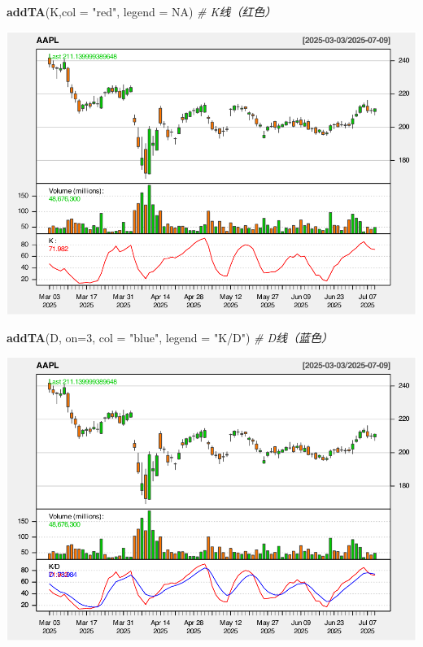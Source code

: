 \documentclass[]{ctexbook}
\newenvironment{Shaded}{\begin{snugshade}}{\end{snugshade}}
\newcommand{\AttributeTok}[1]{\textcolor[rgb]{0.13,0.29,0.53}{#1}}
\newcommand{\CommentTok}[1]{\textcolor[rgb]{0.56,0.35,0.01}{\textit{#1}}}
\newcommand{\ConstantTok}[1]{\textcolor[rgb]{0.56,0.35,0.01}{#1}}
\newcommand{\DecValTok}[1]{\textcolor[rgb]{0.00,0.00,0.81}{#1}}
\newcommand{\FunctionTok}[1]{\textcolor[rgb]{0.13,0.29,0.53}{\textbf{#1}}}
\newcommand{\NormalTok}[1]{#1}
\newcommand{\StringTok}[1]{\textcolor[rgb]{0.31,0.60,0.02}{#1}}
\begin{document}
\begin{Shaded}
\begin{Highlighting}[]
\FunctionTok{addTA}\NormalTok{(K,}\AttributeTok{col =} \StringTok{"red"}\NormalTok{, }\AttributeTok{legend =} \ConstantTok{NA}\NormalTok{)    }\CommentTok{\# K线（红色）}
\end{Highlighting}
\end{Shaded}

\includegraphics[width=0.9\linewidth]{quantmod_files/figure-latex/wpr_2-2}

\begin{Shaded}
\begin{Highlighting}[]
\FunctionTok{addTA}\NormalTok{(D, }\AttributeTok{on=}\DecValTok{3}\NormalTok{, }\AttributeTok{col =} \StringTok{"blue"}\NormalTok{, }\AttributeTok{legend =} \StringTok{"K/D"}\NormalTok{)   }\CommentTok{\# D线（蓝色）}
\end{Highlighting}
\end{Shaded}

\includegraphics[width=0.9\linewidth]{quantmod_files/figure-latex/wpr_2-3}
\end{document}
